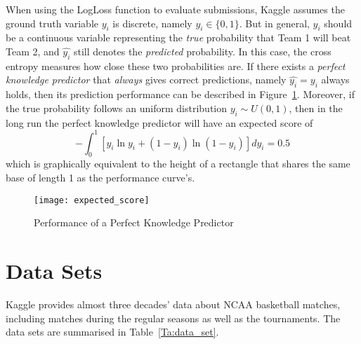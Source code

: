 When using the LogLoss function to evaluate submissions, Kaggle assumes the ground truth variable $y_{i}$ is discrete, namely $y_{i}\in\{0, 1\}$. But in general, $y_{i}$ should be a continuous variable representing the \emph{true} probability that Team 1 will beat Team 2, and $\hat{y_{i}}$ still denotes the \emph{predicted} probability. In this case, the cross entropy measures how close these two probabilities are. If there exists a \emph{perfect knowledge predictor} that \emph{always} gives correct predictions, namely $\hat{y_{i}} = y_{i}$ always holds, then its prediction performance can be described in Figure~\ref{Fig:perfm}. Moreover, if the true probability follows an uniform distribution $y_{i}\sim U(0, 1)$, then in the long run the perfect knowledge predictor will have an expected score of
\begin{equation}
-\int_{0}^{1}[y_{i}\ln{y_{i}} + (1 - y_{i})\ln(1 - y_{i})]dy_{i} = 0.5
\end{equation}
which is graphically equivalent to the height of a rectangle that shares the same base of length 1 as the performance curve's. 
\begin{figure}[h!]
\texttt{[image: expected\_score]}
\centering
\caption{Performance of a Perfect Knowledge Predictor}\label{Fig:perfm}
\end{figure}

\section{Data Sets}\label{Sec:data_set}
Kaggle provides almost three decades' data about NCAA basketball matches, including matches during the regular seasons as well as the tournaments. The data sets are summarised in Table~\ref{Ta:data_set}.
\begin{table}[h!]
\centering
{}
\caption{A Summary of the Data Sets}\label{Ta:data_set}
\end{table}

